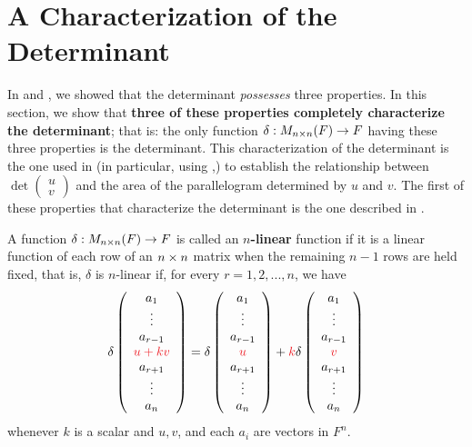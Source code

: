 \section{A Characterization of the Determinant} \label{sec 4.5}

In  and , we showed that the determinant \emph{possesses} three properties.
In this section, we show that \textbf{three of these properties completely characterize the determinant};
that is: the only function \(\delta: M_{n \times n}(F) \to F\) having these three properties is the determinant.
This characterization of the determinant is the one used in  (in particular, using ,)
to establish the relationship between \(\det \begin{pmatrix} u \\ v \end{pmatrix}\) and the area of the parallelogram determined by \(u\) and \(v\).
The first of these properties that characterize the determinant is the one
described in .

\begin{definition} \label{def 4.3}
A function \(\delta: M_{n \times n}(F) \to F\) is called an \textbf{\(n\)-linear} function if it is a linear function of each row of an \(n \times n\) matrix when the remaining \(n - 1\) rows are held fixed,
that is, \(\delta\) is \(n\)-linear if, for every \(r = 1, 2, ..., n\), we have
\[
    \delta\left(\begin{array}{c} a_1 \\ \vdots \\ a_{r - 1} \\ \RED{u + kv} \\ a_{r + 1} \\ \vdots \\ a_n \end{array}\right)
    = \delta\left(\begin{array}{c} a_{1} \\ \vdots \\ a_{r - 1} \\ \RED{u} \\ a_{r + 1} \\ \vdots \\ a_n \end{array}\right)
    + \RED{k} \delta\left(\begin{array}{c} a_1 \\ \vdots \\ a_{r - 1} \\ \RED{v} \\ a_{r + 1} \\ \vdots \\ a_n \end{array}\right)
\]
whenever \(k\) is a scalar and \(u, v\), and each \(a_i\) are vectors in \(F^n\).
\end{definition}

